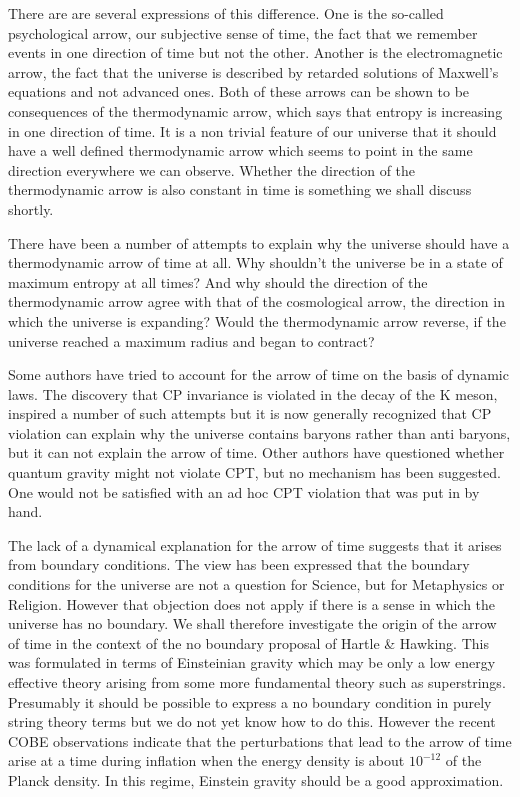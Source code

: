 \documentclass{article}
\begin{document}
There are are several expressions of this difference. One is the
so-called psychological arrow, our subjective sense of time, the fact
that we remember events in one direction of time but not the other.
Another is the electromagnetic arrow, the fact that the universe is
described by retarded solutions of Maxwell's equations and not advanced
ones. Both of these arrows can be shown to be consequences of the
thermodynamic arrow, which says that entropy is increasing in one
direction of time. It is a non trivial feature of our universe that it
should have a well defined thermodynamic arrow which seems to point in
the same direction everywhere we can observe. Whether the direction of
the thermodynamic arrow is also constant in time is something we shall
discuss shortly.

There have been a number of attempts to explain why the universe should
have a thermodynamic arrow of time at all. Why shouldn't the universe be
in a state of maximum entropy at all times? And why should the direction
of the thermodynamic arrow agree with that of the cosmological arrow,
the direction in which the universe is expanding? Would the
thermodynamic arrow reverse, if the universe reached a maximum radius
and began to contract?

Some authors have tried to account for the arrow of time on the basis of
dynamic laws. The discovery that CP invariance is violated in the decay
of the K meson, inspired a number of such attempts but it is now
generally recognized that CP violation can explain why the universe
contains baryons rather than anti baryons, but it can not explain the
arrow of time. Other authors have questioned whether quantum gravity
might not violate CPT, but no mechanism has been suggested. One would
not be satisfied with an ad hoc CPT violation that was put in by hand.

The lack of a dynamical explanation for the arrow of time suggests that
it arises from boundary conditions. The view has been expressed that the
boundary conditions for the universe are not a question for Science, but
for Metaphysics or Religion. However that objection does not apply if
there is a sense in which the universe has no boundary. We shall
therefore investigate the origin of the arrow of time in the context of
the no boundary proposal of Hartle \& Hawking. This was formulated in
terms of Einsteinian gravity which may be only a low energy effective
theory arising from some more fundamental theory such as superstrings.
Presumably it should be possible to express a no boundary condition in
purely string theory terms but we do not yet know how to do this.
However the recent COBE observations indicate that the perturbations
that lead to the arrow of time arise at a time during inflation when the
energy density is about \(10^{-12}\) of the Planck density. In this
regime, Einstein gravity should be a good approximation.
\end{document}
